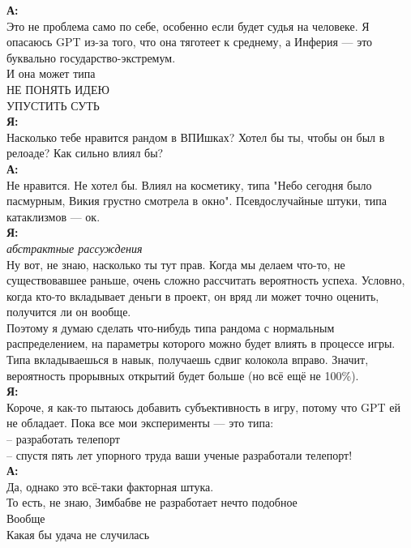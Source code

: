 \textbf{А:}\\
Это не проблема само по себе, особенно если будет судья на человеке. Я опасаюсь GPT из-за того, что она тяготеет к среднему, а Инферия — это буквально государство-экстремум.\\
И она может типа\\
НЕ ПОНЯТЬ ИДЕЮ\\
УПУСТИТЬ СУТЬ\\

\textbf{Я:}\\
Насколько тебе нравится рандом в ВПИшках? Хотел бы ты, чтобы он был в релоаде? Как сильно влиял бы?\\

\textbf{А:}\\
Не нравится. Не хотел бы. Влиял на косметику, типа "Небо сегодня было пасмурным, Викия грустно смотрела в окно". Псевдослучайные штуки, типа катаклизмов — ок.\\

\textbf{Я:}\\
\textit{абстрактные рассуждения}\\
Ну вот, не знаю, насколько ты тут прав. Когда мы делаем что-то, не существовавшее раньше, очень сложно рассчитать вероятность успеха. Условно, когда кто-то вкладывает деньги в проект, он вряд ли может точно оценить, получится ли он вообще.\\

Поэтому я думаю сделать что-нибудь типа рандома с нормальным распределением, на параметры которого можно будет влиять в процессе игры. Типа вкладываешься в навык, получаешь сдвиг колокола вправо. Значит, вероятность прорывных открытий будет больше (но всё ещё не 100\%).\\

\textbf{Я:}\\
Короче, я как-то пытаюсь добавить субъективность в игру, потому что GPT ей не обладает. Пока все мои эксперименты — это типа:\\
– разработать телепорт\\
– спустя пять лет упорного труда ваши ученые разработали телепорт!\\

\textbf{А:}\\
Да, однако это всё-таки факторная штука.\\
То есть, не знаю, Зимбабве не разработает нечто подобное\\
Вообще\\
Какая бы удача не случилась\\

